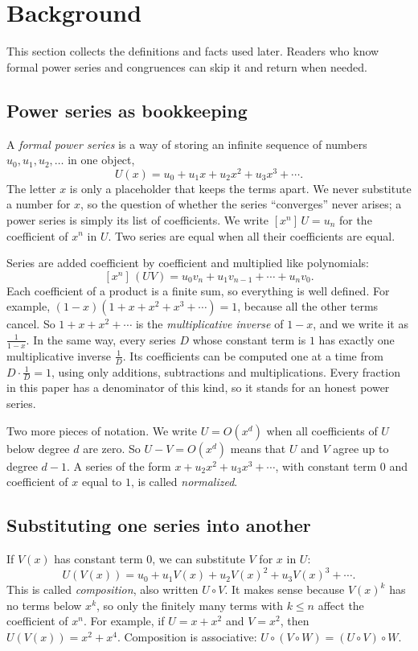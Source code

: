 \documentclass[11pt,a4paper]{article}
\theoremstyle{definition}
\theoremstyle{remark}
\newcommand{\coeff}[2]{[x^{#1}]\,#2}
\begin{document}
\section{Background}\label{sec:background}
This section collects the definitions and facts used later. Readers who know formal power series and congruences can skip it and return when needed.
\subsection{Power series as bookkeeping}
A \emph{formal power series} is a way of storing an infinite sequence of numbers $u_0,u_1,u_2,\dots$ in one object,
\[
U(x)=u_0+u_1x+u_2x^2+u_3x^3+\cdots .
\]
The letter $x$ is only a placeholder that keeps the terms apart. We never substitute a number for $x$, so the question
of whether the series ``converges'' never arises; a power series is simply its list of coefficients. We write
$\coeff{n}{U}=u_n$ for the coefficient of $x^n$ in $U$. Two series are equal when all their coefficients are equal.

Series are added coefficient by coefficient and multiplied like polynomials:
\[
\coeff{n}{(UV)}=u_0v_n+u_1v_{n-1}+\cdots+u_nv_0 .
\]
Each coefficient of a product is a finite sum, so everything is well defined. For example,
$(1-x)(1+x+x^2+x^3+\cdots)=1$, because all the other terms cancel. So $1+x+x^2+\cdots$ is the
\emph{multiplicative inverse} of $1-x$, and we write it as $\frac{1}{1-x}$. In the same way, every series $D$ whose
constant term is $1$ has exactly one multiplicative inverse $\frac1D$. Its coefficients can be computed one at a time
from $D\cdot\frac1D=1$, using only additions, subtractions and multiplications. Every fraction in this paper has a
denominator of this kind, so it stands for an honest power series.

Two more pieces of notation. We write $U=O(x^d)$ when all coefficients of $U$ below degree $d$ are zero. So
$U-V=O(x^d)$ means that $U$ and $V$ agree up to degree $d-1$. A series of the form $x+u_2x^2+u_3x^3+\cdots$, with
constant term $0$ and coefficient of $x$ equal to $1$, is called \emph{normalized}.

\subsection{Substituting one series into another}
If $V(x)$ has constant term $0$, we can substitute $V$ for $x$ in $U$:
\[
U(V(x))=u_0+u_1V(x)+u_2V(x)^2+u_3V(x)^3+\cdots .
\]
This is called \emph{composition}, also written $U\circ V$. It makes sense because $V(x)^k$ has no terms below $x^k$,
so only the finitely many terms with $k\le n$ affect the coefficient of $x^n$. For example, if $U=x+x^2$ and $V=x^2$, then
$U(V(x))=x^2+x^4$. Composition is associative: $U\circ(V\circ W)=(U\circ V)\circ W$.
\end{document}
